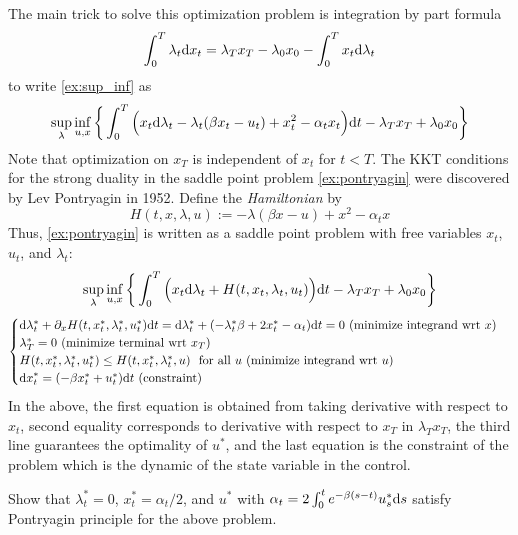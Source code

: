 \documentclass[11pt]{book}
\newcommand{\dd}{\text{\normalfont d}}
\newcommand{\dt}{\text{\normalfont d}t}
\newcommand{\ds}{\text{\normalfont d}s}
\newcommand{\dx}{\text{\normalfont d}x}
\begin{document}
The main trick to solve this optimization problem is integration by part formula
\begin{equation}\label{eqn:pontryagin_ibp}
    \int_0^T \lambda_t {\dx}_t = \lambda_T x_T - \lambda_0 x_0 - \int_0^T x_t{\dd}\lambda_t
\end{equation}
to write 
\eqref{ex:sup_inf} as
\begin{equation}\label{ex:pontryagin}
    \sup_{\lambda}\inf_{u,x}\bigg\{\int_0^T\Big(x_t {\dd}\lambda_t-\lambda_t( \beta x_t - u_t )+ x_t^2 - \alpha_t x_t \Big) {\dt} - \lambda_T x_T + \lambda_0 x_0\bigg\}
\end{equation}
Note that optimization on $x_T$ is independent of  $x_t$ for $t<T$. The KKT conditions for the strong duality in the saddle point problem \eqref{ex:pontryagin} were discovered by Lev Pontryagin in 1952. Define the \emph{Hamiltonian} by
\begin{equation}
    H(t,x,\lambda,u):=-\lambda( \beta x - u )+ x^2 - \alpha_t x
\end{equation}
Thus, \eqref{ex:pontryagin} is written as a saddle point problem with free variables $x_t$, $u_t$, and $\lambda_t$:
\begin{equation}
    \sup_{\lambda}\inf_{u,x}\bigg\{\int_0^T\Big(x_t {\dd}\lambda_t+ H(t,x_t,\lambda_t,u_t)\Big) {\dt} - \lambda_T x_T + \lambda_0 x_0\bigg\}
\end{equation}
\begin{equation}
    \begin{cases}
        {\dd}\lambda^*_t+ \partial_x H(t,x^*_t,\lambda^*_t,u^*_t){\dt}={\dd}\lambda^*_t+ (-\lambda^*_t \beta  +2x^*_t -\alpha_t){\dt}=0~ (\textrm{minimize integrand wrt $x$})\\
        \lambda^*_T=0 ~(\textrm{minimize terminal wrt $x_T$})\\
        H(t,x^*_t,\lambda^*_t,u^*_t)\le H(t,x^*_t,\lambda^*_t,u)~\textrm{ for all } u ~(\textrm{minimize integrand wrt $u$})\\
        {\dx}^*_t = (-\beta x^*_t + u^*_t) {\dt} ~(\textrm{constraint})
        \end{cases}
\end{equation}
In the above, the first equation  is obtained from taking derivative with respect to $x_t$, second equality corresponds to derivative with respect to $x_T$ in $\lambda_T x_T$, the third line guarantees the optimality of $u^*$, and the last equation is the  constraint of the problem which is the dynamic of the state variable in the control. 
\begin{ex}
    Show that $\lambda^*_t=0$, $x^*_t=\alpha_t/2$, and $u^*$ with $\alpha_t=2\int_0^te^{-\beta (s-t)}u^*_s {{\ds}}$ satisfy Pontryagin principle for the above problem. 
\end{ex}
\end{document}
